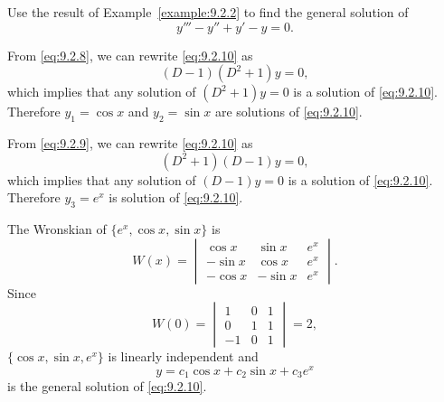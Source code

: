 \documentclass{ximera}
\begin{document}
\begin{example}\label{example:9.2.3}
Use the result of Example~\ref{example:9.2.2} to find the general
solution of
\begin{equation} \label{eq:9.2.10}
y'''-y''+y'-y=0.
\end{equation}


\begin{explanation}
From \eqref{eq:9.2.8}, we can rewrite \eqref{eq:9.2.10} as
$$
(D-1)(D^2+1)y=0,
$$
which implies that any solution of $(D^2+1)y=0$ is a solution of
\eqref{eq:9.2.10}. Therefore $y_1=\cos x$ and $y_2=\sin x$ are solutions
of \eqref{eq:9.2.10}.


From \eqref{eq:9.2.9}, we can rewrite \eqref{eq:9.2.10} as
$$
(D^2+1)(D-1)y=0,
$$
which implies that any solution of $(D-1)y=0$ is a solution of
\eqref{eq:9.2.10}. Therefore $y_3=e^x$ is solution of \eqref{eq:9.2.10}.

The Wronskian of $\{e^x,\cos x,\sin x\}$ is
$$
W(x)=\begin{vmatrix}\cos x&\sin x&e^x\\-\sin x&\cos x&e^x\\
-\cos x&-\sin x&e^x\end{vmatrix}.
$$
Since
$$
W(0)=\begin{vmatrix}1&0&1\\0&1&1\\
-1&0&1\end{vmatrix}=2,
$$
 $\{\cos x,\sin x,e^x\}$ is linearly independent
and
$$
y=c_1\cos x+c_2\sin x+c_3e^x
$$
is the general solution of \eqref{eq:9.2.10}.
\end{explanation}
\end{example}
\end{document}

